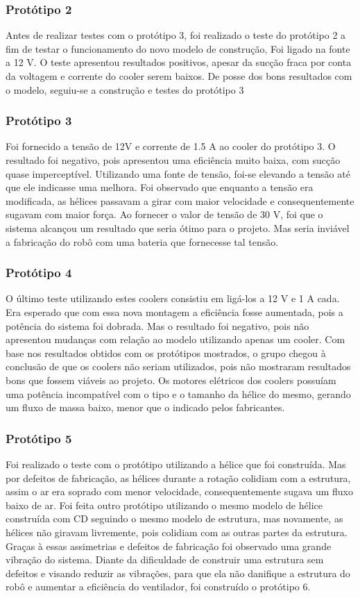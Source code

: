 \subsubsection{Protótipo 2}
Antes de realizar testes com o protótipo 3, foi realizado o teste do protótipo 2 a fim de testar o funcionamento do novo modelo de construção, Foi ligado na fonte a 12 V. O teste apresentou resultados positivos, apesar da sucção fraca por conta da voltagem e corrente do cooler serem baixos. De posse dos bons resultados com o modelo, seguiu-se a construção e testes do protótipo 3

\subsubsection{Protótipo 3}
Foi fornecido a tensão de 12V e corrente de 1.5 A ao cooler do protótipo 3. O resultado foi negativo, pois apresentou uma eficiência muito baixa, com sucção quase imperceptível. Utilizando uma fonte de tensão, foi-se elevando a tensão até que ele indicasse uma melhora. Foi observado que enquanto a tensão era modificada, as hélices passavam a girar com maior velocidade e consequentemente sugavam com maior força. Ao fornecer o valor de tensão de 30 V, foi que o sistema alcançou um resultado que seria ótimo para o projeto. Mas seria inviável a fabricação do robô com uma bateria que fornecesse tal tensão.

\subsubsection{Protótipo 4}    
O último teste utilizando estes coolers consistiu em ligá-los a 12 V e 1 A cada. Era esperado que com essa nova montagem a eficiência fosse aumentada, pois a potência do sistema foi dobrada. Mas o resultado foi negativo, pois não apresentou mudanças com relação ao modelo utilizando apenas um cooler. Com base nos resultados obtidos com os protótipos mostrados, o grupo chegou à conclusão de que os coolers não seriam utilizados, pois não mostraram resultados bons que fossem viáveis ao projeto. Os motores elétricos dos coolers possuíam uma potência incompatível com o tipo e o tamanho da hélice do mesmo, gerando um fluxo de massa baixo, menor que o indicado pelos fabricantes. 

\subsubsection{Protótipo 5}
Foi realizado o teste com o protótipo utilizando a hélice que foi construída. Mas por defeitos de fabricação, as hélices durante a rotação colidiam com a estrutura, assim o ar era soprado com menor velocidade, consequentemente sugava um fluxo baixo de ar. 
Foi feita outro protótipo utilizando o mesmo modelo de hélice construída com CD seguindo o mesmo modelo de estrutura, mas novamente, as hélices não giravam livremente, pois colidiam com as outras partes da estrutura. Graças à essas assimetrias e defeitos de fabricação foi observado uma grande vibração do sistema. Diante da dificuldade de construir uma estrutura sem defeitos e visando reduzir as vibrações, para que ela não danifique a estrutura do robô e aumentar a eficiência do ventilador, foi construído o protótipo 6.

